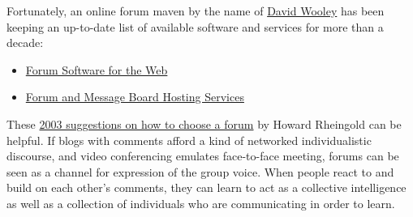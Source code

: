 Fortunately, an online forum maven by the name of
\href{http://thinkofit.com/whoweare.htm}{David Wooley} has been keeping
an up-to-date list of available software and services for more than a
decade:

\begin{itemize}
\tightlist
\item
  \href{http://thinkofit.com/webconf/forumsoft.htm}{Forum Software for
  the Web}
\item
  \href{http://thinkofit.com/webconf/hostsites.htm}{Forum and Message
  Board Hosting Services}
\end{itemize}

These
\href{https://docs.google.com/document/d/1D606u7SfVD3p7xH0lbf2mOO1hIdX97r7kVe753hSYeE/edit}{2003
suggestions on how to choose a forum} by Howard Rheingold can be
helpful. If blogs with comments afford a kind of networked
individualistic discourse, and video conferencing emulates face-to-face
meeting, forums can be seen as a channel for expression of the group
voice. When people react to and build on each other's comments, they can
learn to act as a collective intelligence as well as a collection of
individuals who are communicating in order to learn.

~
